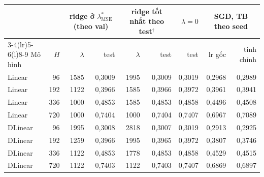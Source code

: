 \begin{tabular}{@{}lr rr rr r rr@{}}
\toprule
 & & \multicolumn{2}{c}{ridge ở $\lambda^*_{\mathrm{MSE}}$ (theo val)} & \multicolumn{2}{c}{ridge tốt nhất theo test$^\dagger$} & $\lambda = 0$ & \multicolumn{2}{c}{SGD, TB theo seed} \\
\cmidrule(lr){3-4}\cmidrule(lr){5-6}\cmidrule(l){8-9}
Mô hình & $H$ & $\lambda$ & test & $\lambda$ & test & test & lr gốc & tinh chỉnh \\
\midrule
Linear & 96 & 1585 & 0{,}3009 & 1995 & 0{,}3009 & 0{,}3019 & 0{,}2968 & 0{,}2989 \\
Linear & 192 & 1122 & 0{,}3966 & 1585 & 0{,}3966 & 0{,}3972 & 0{,}3961 & 0{,}3941 \\
Linear & 336 & 1000 & 0{,}4853 & 1585 & 0{,}4853 & 0{,}4858 & 0{,}4496 & 0{,}4508 \\
Linear & 720 & 1000 & 0{,}7404 & 1000 & 0{,}7404 & 0{,}7407 & 0{,}6967 & 0{,}7089 \\
\addlinespace[2pt]
DLinear & 96 & 1995 & 0{,}3008 & 2818 & 0{,}3007 & 0{,}3019 & 0{,}2913 & 0{,}2925 \\
DLinear & 192 & 1259 & 0{,}3966 & 1995 & 0{,}3965 & 0{,}3972 & 0{,}3807 & 0{,}3746 \\
DLinear & 336 & 1122 & 0{,}4853 & 1778 & 0{,}4853 & 0{,}4858 & 0{,}4529 & 0{,}4515 \\
DLinear & 720 & 1122 & 0{,}7403 & 1122 & 0{,}7403 & 0{,}7407 & 0{,}6869 & 0{,}6897 \\
\bottomrule
\end{tabular}
